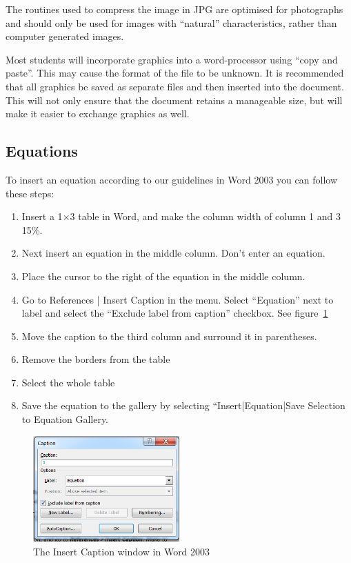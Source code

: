 \documentclass[a5paper, 10pt]{article}
\begin{document}
The routines used to compress the image in JPG are optimised for
photographs and should only be used for images with ``natural''
characteristics, rather than computer generated images.

Most students will incorporate graphics into a word-processor using
``copy and paste''.  This may cause the format of the file to be
unknown.  It is recommended that all graphics be saved as separate
files and then inserted into the document.  This will not only ensure
that the document retains a manageable size, but will make it easier to
exchange graphics as well.

\subsection{Equations}
\label{sec:tips-equations}
To insert an equation according to our guidelines in Word 2003 you can follow these steps:
\begin{enumerate}
\item Insert a 1$\times$3 table in Word, and make the column width of column 1 and 3 15\%.
\item Next insert an equation in the middle column. Don't enter an equation.
\item Place the cursor to the right of the equation in the middle column.
\item Go to References | Insert Caption in the menu. Select ``Equation'' next to label and select the ``Exclude label from caption'' checkbox. See figure~\ref{fig:wordcaption}
\item Move the caption to the third column and surround it in parentheses.
\item Remove the borders from the table
\item Select the whole table
\item Save the equation to the gallery by selecting ``Insert|Equation|Save Selection to Equation Gallery.
\end{enumerate}
\begin{figure}[htbp]
  \centering
  \includegraphics[width=0.5\textwidth]{captionwindow}
  \caption{The Insert Caption window in Word 2003}
  \label{fig:wordcaption}
\end{figure}
\end{document}
